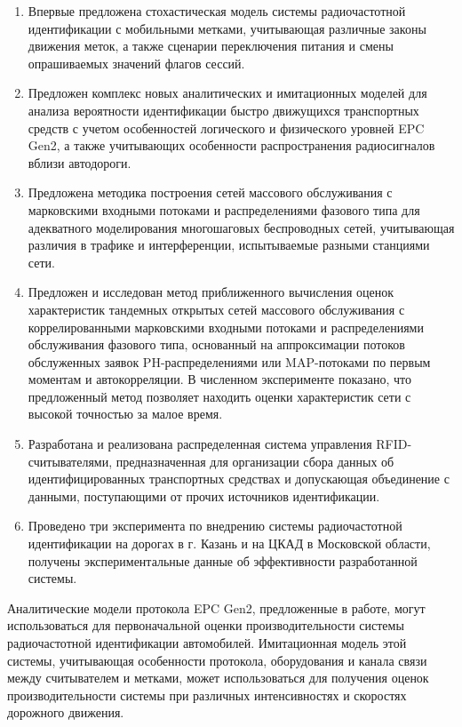 {\novelty}
\begin{enumerate}[beginpenalty=10000] %
  \item Впервые предложена стохастическая модель системы радиочастотной идентификации с мобильными метками, учитывающая различные законы движения меток, а также сценарии переключения питания и смены опрашиваемых значений флагов сессий.
  \item Предложен комплекс новых аналитических и имитационных моделей для анализа вероятности идентификации быстро движущихся транспортных средств с учетом особенностей логического и физического уровней EPC Gen2, а также учитывающих особенности распространения радиосигналов вблизи автодороги.
  \item Предложена методика построения сетей массового обслуживания с марковскими входными потоками и распределениями фазового типа для адекватного моделирования многошаговых беспроводных сетей, учитывающая различия в трафике и интерференции, испытываемые разными станциями сети.
  \item Предложен и исследован метод приближенного вычисления оценок характеристик тандемных открытых сетей массового обслуживания с коррелированными марковскими входными потоками и распределениями обслуживания фазового типа, основанный на аппроксимации потоков обслуженных заявок PH-распределениями или MAP-потоками по первым моментам и автокорреляции. В численном эксперименте показано, что предложенный метод позволяет находить оценки характеристик сети с высокой точностью за малое время.
  \item Разработана и реализована распределенная система управления RFID-считывателями, предназначенная для организации сбора данных об идентифицированных транспортных средствах и допускающая объединение с данными, поступающими от прочих источников идентификации.
  \item Проведено три эксперимента по внедрению системы радиочастотной идентификации на дорогах в г. Казань и на ЦКАД в Московской области, получены экспериментальные данные об эффективности разработанной системы.
\end{enumerate}

{\influence}
Аналитические модели протокола EPC Gen2, предложенные в работе, могут использоваться для первоначальной оценки производительности системы радиочастотной идентификации автомобилей. Имитационная модель этой системы, учитывающая особенности протокола, оборудования и канала связи между считывателем и метками, может использоваться для получения оценок производительности системы при различных интенсивностях и скоростях дорожного движения.

